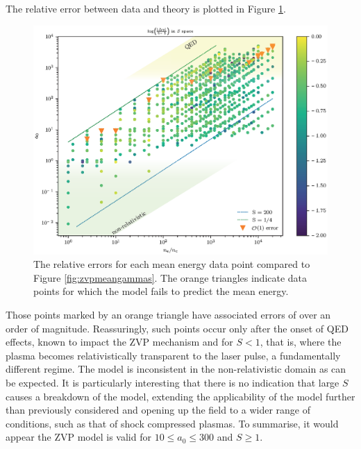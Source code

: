 The relative error between data and theory is plotted in Figure \ref{fig:zvp-logabserrortedit}. 
\begin{figure}
	\centering
	\includegraphics[width=1\linewidth]{figures/zvp/zvp_log_abs_error_T_edit.eps}
	\caption[The relative errors for each mean energy data point compared to Figure \ref{fig:zvpmeangammas}.]{The relative errors for each mean energy data point compared to Figure \ref{fig:zvpmeangammas}. The orange triangles indicate data points for which the model fails to predict the mean energy.}
	\label{fig:zvp-logabserrortedit}
\end{figure}
Those points marked by an orange triangle have associated errors of over an order of magnitude. Reassuringly, such points occur only after the onset of QED effects, known to impact the ZVP mechanism \cite{savinEnergyAbsorptionLaserQED2019} and for $S<1$, that is, where the plasma becomes relativistically transparent to the laser pulse, a fundamentally different regime. The model is inconsistent in the non-relativistic domain as can be expected. It is particularly interesting that there is no indication that large $S$ causes a breakdown of the model, extending the applicability of the model further than previously considered and opening up the field to a wider range of conditions, such as that of shock compressed plasmas. To summarise, it would appear the ZVP model is valid for $10 \le a_0 \le 300$ and $S\ge1$.

